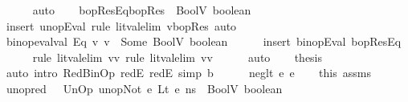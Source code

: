 \begin{isabellebody}
\ \ \ \ \isamarkupfalse%
\ auto\isanewline
\isanewline
\ \ \isamarkupfalse%
\ bopResEq{\isacharcolon}{\kern0pt}{\isachardoublequoteopen}bopRes\ {\isacharequal}{\kern0pt}\ BoolV\ {\isacharparenleft}{\kern0pt}{\isasymnot}boolean{\isacharparenright}{\kern0pt}{\isachardoublequoteclose}\ \isanewline
\ \ \ \ \isamarkupfalse%
\ {\isacharparenleft}{\kern0pt}insert\ unopEval{\isacharcomma}{\kern0pt}\ rule\ lit{\isacharunderscore}{\kern0pt}val{\isacharunderscore}{\kern0pt}elim{\isacharbrackleft}{\kern0pt}\ v{\isacharequal}{\kern0pt}bopRes{\isacharbrackright}{\kern0pt}{\isacharparenright}{\kern0pt}\ auto\isanewline
\isanewline
\ \ \isamarkupfalse%
\ {\isachardoublequoteopen}binop{\isacharunderscore}{\kern0pt}eval{\isacharunderscore}{\kern0pt}val\ Eq\ v{}\ v{}\ {\isacharequal}{\kern0pt}\ Some\ {\isacharparenleft}{\kern0pt}BoolV\ boolean{\isacharparenright}{\kern0pt}{\isachardoublequoteclose}\isanewline
\ \ \ \ \isamarkupfalse%
\ {\isacharparenleft}{\kern0pt}insert\ binopEval\ bopResEq{\isacharparenright}{\kern0pt}\isanewline
\ \ \ \ \isamarkupfalse%
\ {\isacharparenleft}{\kern0pt}rule\ lit{\isacharunderscore}{\kern0pt}val{\isacharunderscore}{\kern0pt}elim{\isacharbrackleft}{\kern0pt}\ v{\isacharequal}{\kern0pt}v{}{\isacharbrackright}{\kern0pt}{\isacharsemicolon}{\kern0pt}\ rule\ lit{\isacharunderscore}{\kern0pt}val{\isacharunderscore}{\kern0pt}elim{\isacharbrackleft}{\kern0pt}\ v{\isacharequal}{\kern0pt}v{}{\isacharbrackright}{\kern0pt}{\isacharparenright}{\kern0pt}\isanewline
\ \ \ \ \isamarkupfalse%
\ auto\isanewline
\isanewline
\ \ \isamarkupfalse%
\ {\isacharquery}{\kern0pt}thesis\isanewline
\ \ \ \ \isamarkupfalse%
\ {\isacharparenleft}{\kern0pt}auto\ intro{\isacharcolon}{\kern0pt}\ RedBinOp\ redE{}\ redE{}\ simp{\isacharcolon}{\kern0pt}\ {\isacartoucheopen}b\ {\isacharequal}{\kern0pt}\ {\isacharunderscore}{\kern0pt}{\isacartoucheclose}{\isacharparenright}{\kern0pt}\isanewline
{}\isamarkupfalse%
\isanewline
\ \ \isamarkupfalse%
\ {\isacharparenleft}{\kern0pt}neg{\isacharunderscore}{\kern0pt}lt\ e{}\ e{}{\isacharparenright}{\kern0pt}\isanewline
\ \ \isamarkupfalse%
\ this\ assms\ \isamarkupfalse%
\ unop{\isacharunderscore}{\kern0pt}red{\isacharcolon}{\kern0pt}\ {\isachardoublequoteopen}{\isasymLambda}{\isacharcomma}{\kern0pt}{\isasymGamma}{\isacharcomma}{\kern0pt}{\isasymOmega}\ {\isasymturnstile}\ {\isasymlangle}UnOp\ unop{\isachardot}{\kern0pt}Not\ {\isacharparenleft}{\kern0pt}e{}\ {\isasymguillemotleft}Lt{\isasymguillemotright}\ e{}{\isacharparenright}{\kern0pt}{\isacharcomma}{\kern0pt}\ ns{\isasymrangle}\ {\isasymDown}\ BoolV\ boolean{\isachardoublequoteclose}\ \isamarkupfalse%

\end{isabellebody}
